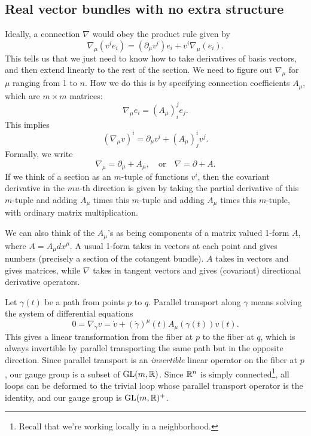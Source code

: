 \subsection{Real vector bundles with no extra structure}
Ideally, a connection $\nabla$ would obey the product rule given by \[
    \nabla_{\mu}(v^i e_i )= (\partial _{\mu}v^i )e_i +v^i \nabla_{\mu}(e_i ).
\] This tells us that we just need to know how to take derivatives of basis vectors, and then extend linearly to the rest of the section. We need to figure out $\nabla_{\mu}$ for $\mu$ ranging from 1 to $n$. How we do this is by specifying connection coefficients $A_{\mu}$, which are $ m \times m$ matrices:
\[
    \nabla_{\mu}e_i = (A_{\mu})^j _i e_j .
\] This implies \[
(\nabla_{\mu}v)^i = \partial _{\mu}v^i  +(A_{\mu})^i _j v^j .
\] Formally, we write \[
\nabla_{\mu}=\partial _{\mu}+A_{\mu},\quad \text{or} \quad \nabla=\partial +A.
\] If we think of a section as an $m$-tuple of functions $v^i $, then the covariant derivative in the $mu$-th direction is given by taking the partial derivative of this $m$-tuple and adding $A_{\mu}$ times this $m$-tuple and adding $A_{\mu}$ times this $m$-tuple, with ordinary matrix multiplication. 

We can also think of the $A_{\mu}$'s as being components of a matrix valued 1-form $A$, where $A= A_{\mu}dx^{\mu}$. A usual 1-form takes in vectors at each point and gives numbers (precisely a section of the cotangent bundle). $A$ takes in vectors and gives matrices, while $\nabla$ takes in tangent vectors and gives (covariant) directional derivative operators.

Let $\gamma (t)$ be a path from points $p$ to $q$. Parallel transport along $\gamma $ means solving the system of differential equations \[
    0 = \nabla_{\dot \gamma }v= \dot v + (\dot \gamma )^{\mu}(t)A_{\mu}(\gamma (t))v(t).
\] This gives a linear transformation from the fiber at $p$ to the fiber at $q$, which is always invertible by parallel transporting the same path but in the opposite direction. Since parallel transport is an \emph{invertible} linear operator on the fiber at $p$, our gauge group is a subset of  $\mathrm{GL}( m,\mathbb{R})$. Since $\mathbb{R}^n $ is simply connected\footnote{Recall that we're working locally in a neighborhood.}, all loops can be deformed to the trivial loop whose parallel transport operator is the identity, and our gauge group is $\mathrm{GL}(m,\mathbb{R})^+$.

